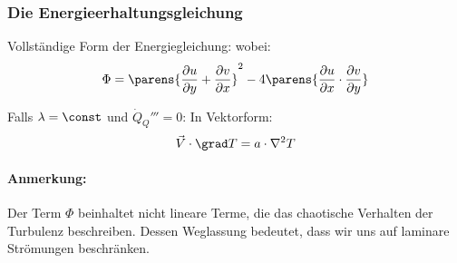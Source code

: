 		\subsubsection{Die Energieerhaltungsgleichung} %
			Vollständige Form der Energiegleichung:
			wobei: \[
				\Phi = \parens{
					\frac{\partial u}{\partial y} + \frac{\partial v}{\partial x}
				}^2 - 4 \parens{
					\frac{\partial u}{\partial x} \cdot \frac{\partial v}{\partial y}
				}
			\]

			Falls $\lambda = \const$ und $\dot Q_Q''' = 0$:
			In Vektorform:
			\[
				\vec V \cdot \grad T = a\cdot \nabla^2T
			\]

			\paragraph{Anmerkung:} %
				Der Term $\Phi$ beinhaltet nicht lineare Terme, die das chaotische Verhalten der Turbulenz beschreiben. Dessen Weglassung bedeutet, dass wir uns auf laminare Strömungen beschränken.
